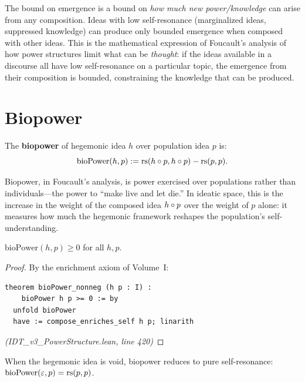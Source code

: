 \begin{interpretation}
The bound on emergence is a bound on \emph{how much new power/knowledge} can
arise from any composition. Ideas with low self-resonance (marginalized ideas,
suppressed knowledge) can produce only bounded emergence when composed with
other ideas. This is the mathematical expression of Foucault's analysis of how
power structures limit what can be \emph{thought}: if the ideas available in a
discourse all have low self-resonance on a particular topic, the emergence
from their composition is bounded, constraining the knowledge that can be
produced.
\end{interpretation}

\section{Biopower}

\begin{definition}[Biopower]
\label{def:biopower}
The \textbf{biopower} of hegemonic idea $h$ over population idea $p$ is:
\[
  \mathrm{bioPower}(h, p) := \mathrm{rs}(h \circ p, h \circ p) - \mathrm{rs}(p, p).
\]
\end{definition}

Biopower, in Foucault's analysis, is power exercised over populations rather
than individuals---the power to ``make live and let die.'' In ideatic space,
this is the increase in the weight of the composed idea $h \circ p$ over the
weight of $p$ alone: it measures how much the hegemonic framework reshapes the
population's self-understanding.

\begin{theorem}
\label{thm:biopower-nonneg}
$\mathrm{bioPower}(h, p) \geq 0$ for all $h, p$.
\end{theorem}

\begin{proof}
By the enrichment axiom of Volume~I:
\begin{lstlisting}
theorem bioPower_nonneg (h p : I) :
    bioPower h p >= 0 := by
  unfold bioPower
  have := compose_enriches_self h p; linarith
\end{lstlisting}
\textit{(IDT\_v3\_PowerStructure.lean, line 420)}
\end{proof}

\begin{theorem}
\label{thm:biopower-void}
When the hegemonic idea is void, biopower reduces to pure self-resonance:
$\mathrm{bioPower}(\varepsilon, p) = \mathrm{rs}(p, p)$.
\end{theorem}

